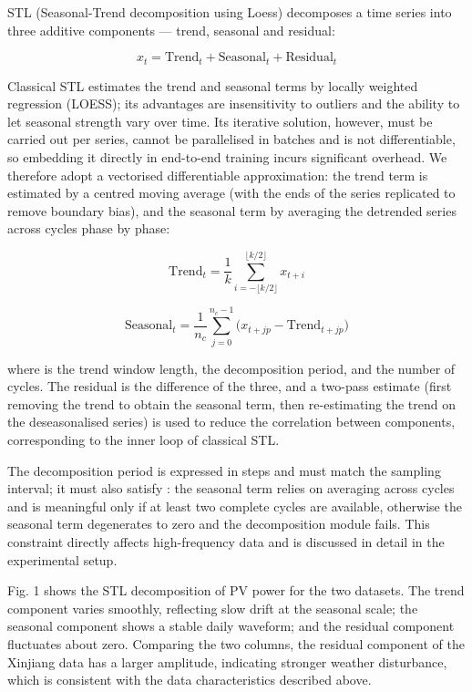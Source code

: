 \documentclass{iopjournal}
\begin{document}
STL (Seasonal-Trend decomposition using Loess) decomposes a time series into three additive components --- trend, seasonal and residual:

\begin{equation}
x_t = \text{Trend}_t + \text{Seasonal}_t + \text{Residual}_t
\end{equation}

Classical STL estimates the trend and seasonal terms by locally weighted regression (LOESS); its advantages are insensitivity to outliers and the ability to let seasonal strength vary over time. Its iterative solution, however, must be carried out per series, cannot be parallelised in batches and is not differentiable, so embedding it directly in end-to-end training incurs significant overhead. We therefore adopt a vectorised differentiable approximation: the trend term is estimated by a centred moving average (with the ends of the series replicated to remove boundary bias), and the seasonal term by averaging the detrended series across cycles phase by phase:

\begin{equation}
\text{Trend}_t = \frac{1}{k}\sum_{i=-\lfloor k/2\rfloor}^{\lfloor k/2\rfloor} x_{t+i}
\end{equation}

\begin{equation}
\text{Seasonal}_t = \frac{1}{n_c}\sum_{j=0}^{n_c-1}\big(x_{t+jp} - \text{Trend}_{t+jp}\big)
\end{equation}

where  is the trend window length,  the decomposition period, and  the number of cycles. The residual is the difference of the three, and a two-pass estimate (first removing the trend to obtain the seasonal term, then re-estimating the trend on the deseasonalised series) is used to reduce the correlation between components, corresponding to the inner loop of classical STL.

The decomposition period  is expressed in steps and must match the sampling interval; it must also satisfy : the seasonal term relies on averaging across cycles and is meaningful only if at least two complete cycles are available, otherwise the seasonal term degenerates to zero and the decomposition module fails. This constraint directly affects high-frequency data and is discussed in detail in the experimental setup.

Fig. 1 shows the STL decomposition of PV power for the two datasets. The trend component varies smoothly, reflecting slow drift at the seasonal scale; the seasonal component shows a stable daily waveform; and the residual component fluctuates about zero. Comparing the two columns, the residual component of the Xinjiang data has a larger amplitude, indicating stronger weather disturbance, which is consistent with the data characteristics described above.
\end{document}
